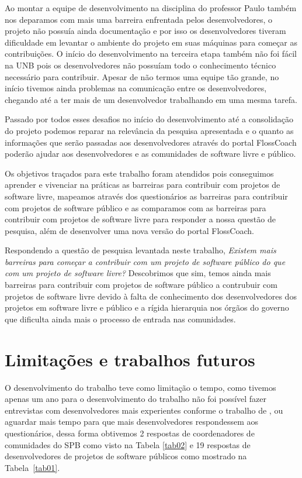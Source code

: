 Ao montar a equipe de desenvolvimento na disciplina do professor Paulo também nos deparamos
com mais uma barreira enfrentada pelos desenvolvedores, o projeto não possuía ainda 
documentação e por isso os desenvolvedores tiveram dificuldade em levantar o ambiente 
do projeto em suas máquinas para começar as contribuições. O início do desenvolvimento
na terceira etapa também não foi fácil na UNB pois os desenvolvedores não possuíam
todo o conhecimento técnico necessário para contribuir.
Apesar de não termos uma equipe tão grande, no início tivemos ainda problemas na
comunicação entre os desenvolvedores, chegando até a ter mais de um desenvolvedor 
trabalhando em uma mesma tarefa.

Passado por todos esses desafios no início do desenvolvimento até a consolidação
do projeto podemos reparar na relevância da pesquisa apresentada e o quanto as
informações que serão passadas aos desenvolvedores através do portal FlossCoach poderão
ajudar aos desenvolvedores e as comunidades de software livre e público.

Os objetivos traçados para este trabalho foram atendidos pois conseguimos aprender
e vivenciar na práticas as barreiras para contribuir com projetos de software livre,
mapeamos através dos questionários as barreiras para contribuir com projetos de 
software público e as comparamos com as barreiras para contribuir com projetos
de software livre para responder a nossa questão de pesquisa, além de desenvolver 
uma nova versão do portal FlossCoach. 

Respondendo a questão de pesquisa levantada neste trabalho, \textit{Existem mais barreiras para 
começar a contribuir com um projeto de software público do que com um projeto de software 
livre?} Descobrimos que sim,
temos ainda mais barreiras para contribuir com projetos de software público a contrubuir
com projetos de software livre devido à falta de conhecimento dos desenvolvedores
dos projetos em software livre e público e a rígida hierarquia nos órgãos do governo
que dificulta ainda mais o processo de entrada nas comunidades.

\section{Limitações e trabalhos futuros}

O desenvolvimento do trabalho teve como limitação o tempo, como tivemos apenas um ano
para o desenvolvimento do trabalho não foi possível fazer entrevistas com desenvolvedores mais
experientes conforme o trabalho de , ou aguardar mais 
tempo para que mais desenvolvedores respondessem aos questionários,
dessa forma obtivemos 2 respostas de coordenadores de comunidades do SPB como visto na Tabela
\ref{tab02} e 19 respostas de desenvolvedores de projetos de software públicos como mostrado
na Tabela~\ref{tab01}.

